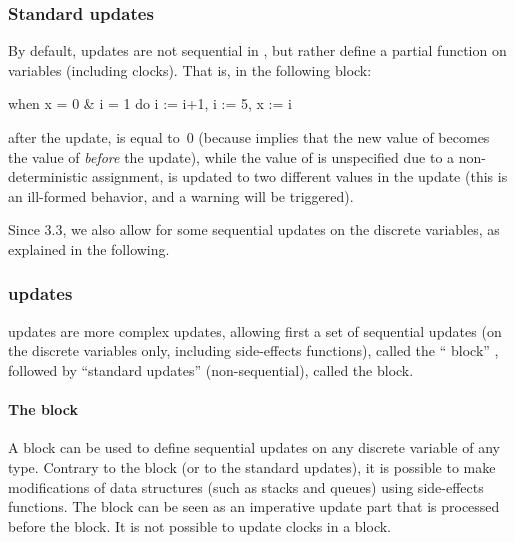 \subsubsection{Standard updates}\label{sss:standard-updates}

By default, updates are not sequential in \imitator{}, but rather define a partial function on variables (including clocks).
That is, in the following block:

\begin{IMITATORmodel}
	when x = 0 & i = 1 do {i := i+1, i := 5, x := i}
\end{IMITATORmodel}

\noindent{}after the update,  is equal to~0 (because  implies that the new value of  becomes the value of  \emph{before} the update), while the value of  is unspecified due to a non-deterministic assignment, \ie{}  is updated to two different values in the update (this is an ill-formed behavior, and a warning will be triggered).

Since \imitator{} 3.3, we also allow for some sequential updates on the discrete variables, as explained in the following.

\subsubsection{ updates}\label{section:seq_then_form_updates}

 updates are more complex updates, allowing first a set of sequential updates (on the discrete variables only, including side-effects functions), called the `` block'' , followed by ``standard updates'' (non-sequential), called the  block.

\paragraph{The  block}

A  block can be used to define sequential updates on any discrete variable of any type.
Contrary to the  block (or to the standard updates), it is possible to make modifications of data structures (such as stacks and queues) using side-effects functions.
The  block can be seen as an imperative update part that is processed before the  block.
It is not possible to update clocks in a  block.

